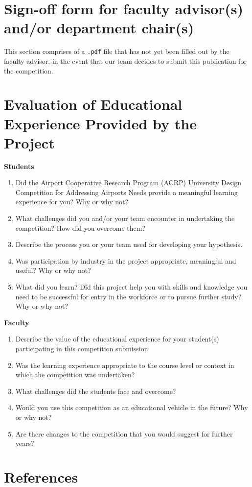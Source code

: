 \documentclass[../main.tex]{subfiles}
\begin{document}
\begin{appendices}
\begin{singlespace}
\section{Sign-off form for faculty advisor(s) and/or department chair(s)}
\noindent  This section comprises of a \texttt{.pdf} file that has not yet been filled out by the faculty advisor, in the event that our team decides to submit this publication for the competition.\par

\newpage
\section{Evaluation of Educational Experience Provided by the Project}\label{apxE}
\noindent\textbf{Students}\newline
\begin{enumerate}
    \item Did the Airport Cooperative Research Program (ACRP) University Design Competition for Addressing Airports Needs provide a meaningful learning experience for you? Why or why not?
    \item What challenges did you and/or your team encounter in undertaking the competition? How did you overcome them?
    \item Describe the process you or your team used for developing your hypothesis.
    \item Was participation by industry in the project appropriate, meaningful and useful? Why or why not?
    \item What did you learn? Did this project help you with skills and knowledge you need to be successful for entry in the workforce or to pursue further study? Why or why not?
\end{enumerate}
\noindent\textbf{Faculty}\newline
\begin{enumerate}
    \item Describe the value of the educational experience for your student(s) participating in this competition submission
    \item Was the learning experience appropriate to the course level or context in which the competition was undertaken?
    \item What challenges did the students face and overcome?
    \item Would you use this competition as an educational vehicle in the future? Why or why not?
    \item Are there changes to the competition that you would suggest for further years?
\end{enumerate}

\newpage
\section{References}\label{apxF}
\printbibliography[heading = none]
\end{singlespace}
\end{appendices}
\end{document}
